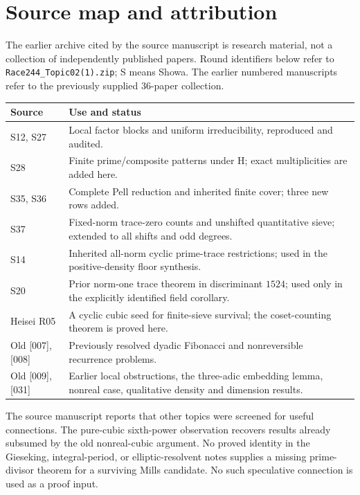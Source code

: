 \documentclass[11pt,a4paper]{article}
\theoremstyle{definition}\newtheorem{definition}[theorem]{Definition}
\theoremstyle{remark}\newtheorem{remark}[theorem]{Remark}
\begin{document}
\section{Source map and attribution}
The earlier archive cited by the source manuscript is research material, not a collection
of independently published papers. Round identifiers below refer to
\texttt{Race244\_Topic02(1).zip}; S means Showa. The earlier numbered
manuscripts refer to the previously supplied 36-paper collection.
\begin{center}\small
\begin{tabular}{p{}p{}}
\toprule
Source & Use and status\\\midrule
S12, S27 & Local factor blocks and uniform irreducibility, reproduced and audited.\\
S28 & Finite prime/composite patterns under H; exact multiplicities are added here.\\
S35, S36 & Complete Pell reduction and inherited finite cover; three new rows added.\\
S37 & Fixed-norm trace-zero counts and unshifted quantitative sieve; extended to all shifts and odd degrees.\\
S14 & Inherited all-norm cyclic prime-trace restrictions; used in the positive-density floor synthesis.\\
S20 & Prior norm-one trace theorem in discriminant $1524$; used only in the explicitly identified field corollary.\\
Heisei R05 & A cyclic cubic seed for finite-sieve survival; the coset-counting theorem is proved here.\\
Old [007], [008] & Previously resolved dyadic Fibonacci and nonreversible recurrence problems.\\
Old [009], [031] & Earlier local obstructions, the three-adic embedding lemma, nonreal case, qualitative density and dimension results.\\
\bottomrule
\end{tabular}
\end{center}
The source manuscript reports that other topics were screened for useful connections.
The pure-cubic sixth-power observation recovers results already
subsumed by the old nonreal-cubic argument. No proved identity in
the Gieseking, integral-period, or elliptic-resolvent notes supplies
a missing prime-divisor theorem for a surviving Mills candidate.
No such speculative connection is used as a proof input.
\end{document}
